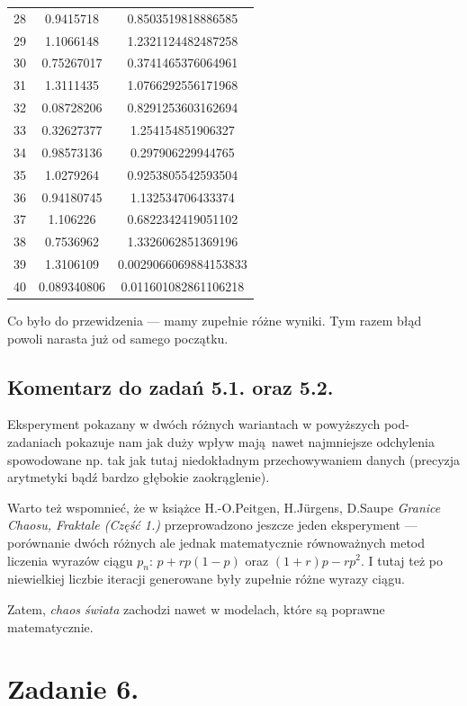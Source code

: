 \documentclass[10pt]{article}
\begin{document}
\begin{center}
\begin{tabular}{|c| c c |}
        28 & 0.9415718 & 0.8503519818886585\\
        29 & 1.1066148 & 1.2321124482487258\\
        30 & 0.75267017 & 0.3741465376064961\\
        31 & 1.3111435 & 1.0766292556171968\\
        32 & 0.08728206 & 0.8291253603162694\\
        33 & 0.32627377 & 1.254154851906327\\
        34 & 0.98573136 & 0.297906229944765\\
        35 & 1.0279264 & 0.9253805542593504\\
        36 & 0.94180745 & 1.132534706433374\\
        37 & 1.106226 & 0.6822342419051102\\
        38 & 0.7536962 & 1.3326062851369196\\
        39 & 1.3106109 & 0.0029066069884153833\\
        40 & 0.089340806 & 0.011601082861106218\\
    \hline
    \end{tabular}
\end{center}

Co było do przewidzenia — mamy zupełnie różne wyniki. Tym razem błąd powoli narasta już od samego początku.

\subsection{Komentarz do zadań 5.1. oraz 5.2.}

Eksperyment pokazany w dwóch różnych wariantach w powyższych pod-zadaniach pokazuje nam jak duży wpływ mają nawet najmniejsze odchylenia spowodowane np. tak jak tutaj niedokładnym przechowywaniem danych (precyzja arytmetyki bądź bardzo głębokie zaokrąglenie).

Warto też wspomnieć, że w książce H.-O.Peitgen, H.Jürgens, D.Saupe \textit{Granice Chaosu, Fraktale (Część 1.)} przeprowadzono jeszcze jeden eksperyment — porównanie dwóch różnych ale jednak matematycznie równoważnych metod liczenia wyrazów ciągu $p_n$: $p + rp(1-p)$ oraz $(1+r)p - rp^2$. I tutaj też po niewielkiej liczbie iteracji generowane były zupełnie różne wyrazy ciągu.

Zatem, \textit{chaos świata} zachodzi nawet w modelach, które są poprawne matematycznie.

\section{Zadanie 6.}
\end{document}
